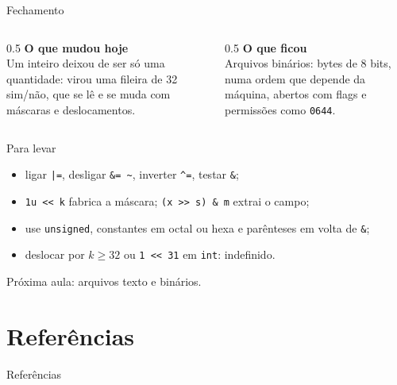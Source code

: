 \documentclass[aspectratio=169]{beamer}
\newcommand{\til}{\textasciitilde}
\newcommand{\cir}{\textasciicircum}
\begin{document}
\begin{frame}{Fechamento}
  \begin{columns}[T]
    \begin{column}{0.5\textwidth}
      \textbf{O que mudou hoje}\\[0.3em]
      \small Um inteiro deixou de ser só uma quantidade: virou uma fileira
      de 32 sim/não, que se lê e se muda com máscaras e deslocamentos.
    \end{column}
    \begin{column}{0.5\textwidth}
      \textbf{O que ficou}\\[0.3em]
      \small Arquivos binários: bytes de 8 bits, numa ordem que depende
      da máquina, abertos com flags e permissões como \texttt{0644}.
    \end{column}
  \end{columns}
  \begin{block}{Para levar}
    \begin{itemize}
      \small
      \item ligar \texttt{|=}, desligar \texttt{\&= \til}, inverter
        \texttt{\cir=}, testar \texttt{\&};
      \item \texttt{1u <{}< k} fabrica a máscara; \texttt{(x >{}> s) \& m} extrai
        o campo;
      \item use \texttt{unsigned}, constantes em octal ou hexa e parênteses
        em volta de \texttt{\&};
      \item deslocar por $k \geq 32$ ou \texttt{1 <{}< 31} em \texttt{int}:
        indefinido.
    \end{itemize}
  \end{block}
  \small\textcolor{UFSGray}{Próxima aula: arquivos texto e binários.}
\end{frame}

\section*{Referências}
\begin{frame}[allowframebreaks]{Referências}
  \nocite{*}
  
  
\end{frame}
\end{document}
